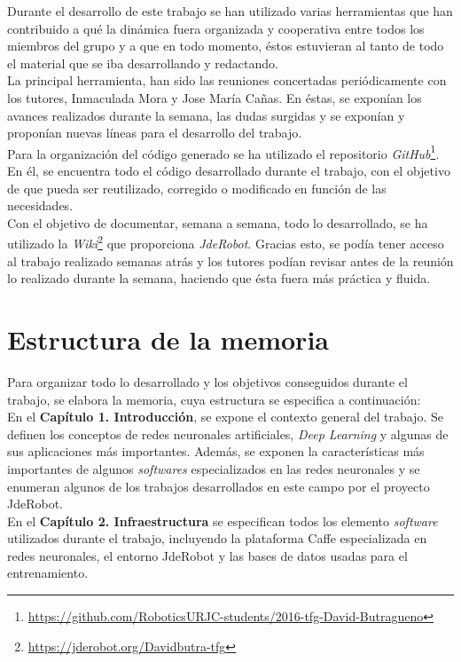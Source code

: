 \documentclass[a4paper, 12pt, spanish, chapterprefix, numbers=noenddot]{book}
\begin{document}
Durante el desarrollo de este trabajo se han utilizado varias herramientas que han contribuido a qué la dinámica fuera organizada y cooperativa entre todos los miembros del grupo y a que en todo momento, éstos estuvieran al tanto de todo el material que se iba desarrollando y redactando.\\

La principal herramienta, han sido las reuniones concertadas periódicamente con los tutores, Inmaculada Mora y Jose María Cañas. En éstas, se exponían los avances realizados durante la semana, las dudas surgidas y se exponían y proponían nuevas líneas para el desarrollo del trabajo.\\

Para la organización del código generado se ha utilizado el repositorio \textit{GitHub}\footnote{\url{https://github.com/RoboticsURJC-students/2016-tfg-David-Butragueno}}. En él, se encuentra todo el código desarrollado durante el trabajo, con el objetivo de que pueda ser reutilizado, corregido o modificado en función de las necesidades.\\

Con el objetivo de documentar, semana a semana, todo lo desarrollado, se ha utilizado la \textit{Wiki}\footnote{\url{https://jderobot.org/Davidbutra-tfg}} que proporciona \textit{JdeRobot}. Gracias esto, se podía tener acceso al trabajo realizado semanas atrás y los tutores podían revisar antes de la reunión lo realizado durante la semana, haciendo que ésta fuera más práctica y fluida.

\section{Estructura de la memoria}

Para organizar todo lo desarrollado y los objetivos conseguidos durante el trabajo, se elabora la memoria, cuya estructura se especifica a continuación:\\

En el \textbf{Capítulo 1. Introducción}, se expone el contexto general del trabajo. Se definen los conceptos de redes neuronales artificiales, \textit{Deep Learning} y algunas de sus aplicaciones más importantes. Además, se exponen la características más importantes de algunos \textit{softwares} especializados en las redes neuronales y se enumeran algunos de los trabajos desarrollados en este campo por el proyecto JdeRobot.\\

En el \textbf{Capítulo 2. Infraestructura} se especifican todos los elemento \textit{software} utilizados durante el trabajo, incluyendo la plataforma Caffe especializada en redes neuronales, el entorno JdeRobot y las bases de datos usadas para el entrenamiento.\\
\end{document}
